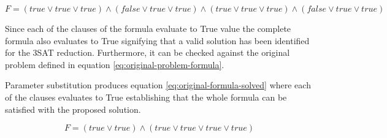 \begin{equation}\label{eq:3sat-solved-formula}
F = (true \lor true \lor true) \land (false \lor true \lor true) \land (true \lor true \lor true) \land(false \lor true \lor true)
\end{equation}

Since each of the clauses of the formula evaluate to True value the complete formula also evaluates to True signifying that a valid solution has been identified for the 3SAT reduction. Furthermore, it can be checked against the original problem defined in equation \ref{eq:original-problem-formula}.

Parameter substitution produces equation \ref{eq:original-formula-solved} where each of the clauses evaluates to True establishing that the whole formula can be satisfied with the proposed solution.

\begin{equation}\label{eq:original-formula-solved}
F = (true \lor true) \land (true \lor true \lor true \lor true) 
\end{equation}

